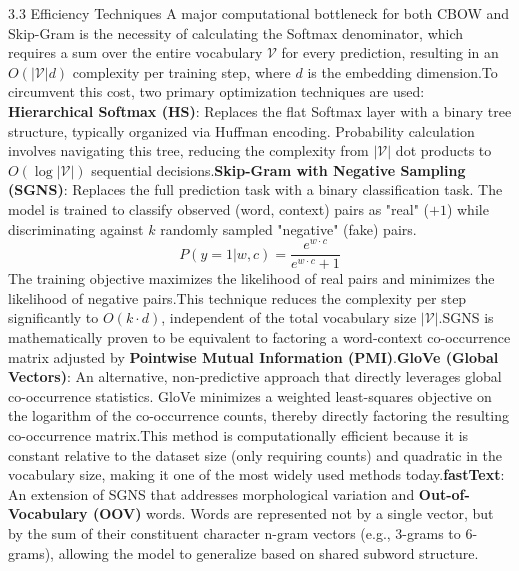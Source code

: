 \documentclass{article}
\begin{document}
3.3 Efficiency Techniques
A major computational bottleneck for both CBOW and Skip-Gram is the necessity of calculating the Softmax denominator, which requires a sum over the entire vocabulary $\mathcal{V}$ for every prediction, resulting in an $O(|\mathcal{V}|d)$ complexity per training step, where $d$ is the embedding dimension.\footnotemark[1]
To circumvent this cost, two primary optimization techniques are used:
\textbf{Hierarchical Softmax (HS)}: Replaces the flat Softmax layer with a binary tree structure, typically organized via Huffman encoding. Probability calculation involves navigating this tree, reducing the complexity from $|\mathcal{V}|$ dot products to $O(\log |\mathcal{V}|)$ sequential decisions.\footnotemark[1]
\textbf{Skip-Gram with Negative Sampling (SGNS)}: Replaces the full prediction task with a binary classification task. The model is trained to classify observed (word, context) pairs as "real" ($+1$) while discriminating against $k$ randomly sampled "negative" (fake) pairs.
$$P(y=1|w,c)=\frac{e^{w \cdot c}}{e^{w \cdot c}+1}$$
The training objective maximizes the likelihood of real pairs and minimizes the likelihood of negative pairs.\footnotemark[1] This technique reduces the complexity per step significantly to $O(k\cdot d)$, independent of the total vocabulary size $|\mathcal{V}|$.\footnotemark[1] SGNS is mathematically proven to be equivalent to factoring a word-context co-occurrence matrix adjusted by \textbf{Pointwise Mutual Information (PMI)}.\footnotemark[1]
\textbf{GloVe (Global Vectors)}: An alternative, non-predictive approach that directly leverages global co-occurrence statistics. GloVe minimizes a weighted least-squares objective on the logarithm of the co-occurrence counts, thereby directly factoring the resulting co-occurrence matrix.\footnotemark[1] This method is computationally efficient because it is constant relative to the dataset size (only requiring counts) and quadratic in the vocabulary size, making it one of the most widely used methods today.\footnotemark[1]
\textbf{fastText}: An extension of SGNS that addresses morphological variation and \textbf{Out-of-Vocabulary (OOV)} words. Words are represented not by a single vector, but by the sum of their constituent character n-gram vectors (e.g., 3-grams to 6-grams), allowing the model to generalize based on shared subword structure.\footnotemark[1]
\end{document}

